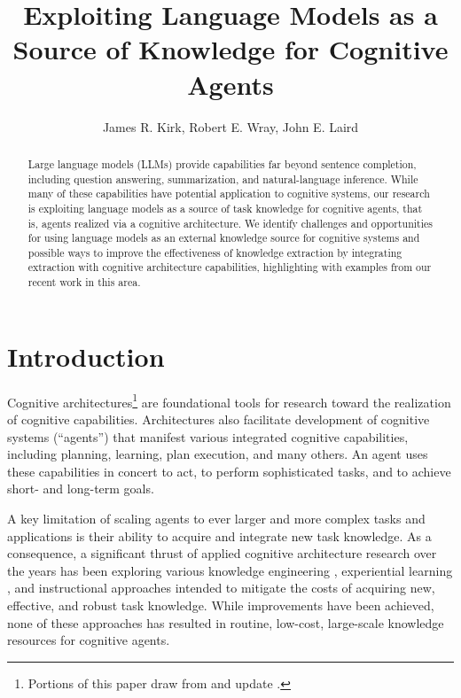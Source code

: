 \documentclass[letterpaper]{article} %
\title{Exploiting Language Models as a Source of Knowledge for Cognitive Agents}
\author{
    James R. Kirk, Robert E. Wray, John E. Laird
}
\begin{document}
\maketitle

\begin{abstract}
Large language models (LLMs) provide capabilities far beyond sentence completion, including question answering, summarization, and natural-language inference. While many of these capabilities have potential application to cognitive systems, our research is exploiting language models as a source of task knowledge for cognitive agents, that is, agents realized via a cognitive architecture. We identify challenges and opportunities for using language models as an external knowledge source for cognitive systems and possible ways to improve the effectiveness of knowledge extraction by integrating extraction with cognitive architecture capabilities, highlighting with examples from our recent work in this area.
\end{abstract}

%

%

%
%
%
%
%
%
%

\section{Introduction}

Cognitive architectures\footnote{Portions of this paper draw from and update  \citet{wray_language_2021}.} \cite{anderson_integrated_2004,laird_soar_2012,kotseruba_40_2020,newell_unified_1990} are foundational tools  for research toward the realization of cognitive capabilities. Architectures also facilitate development of cognitive systems (``agents'') that manifest various integrated cognitive capabilities, including planning, learning, plan execution, and many others. An agent uses these capabilities in concert to act, to perform sophisticated tasks, and to achieve short- and long-term goals.

A key limitation of scaling agents to ever larger and more complex tasks and applications is their ability to acquire and integrate new task knowledge. As a consequence, a significant thrust of applied cognitive architecture research over the years has been exploring various knowledge engineering  \cite{yost_acquiring_1993,crossman_high_2004,ritter_high-level_2006}, experiential learning \cite{nejati_learning_2006,choi_evolution_2018,pearson_toward_1998}, and instructional \cite{huffman_flexibly_1995,gluck_interactive_2019} approaches intended to mitigate the costs of acquiring new, effective, and robust task knowledge. While improvements have been achieved, none of these approaches has resulted in routine, low-cost, large-scale knowledge resources for cognitive agents.
\end{document}

